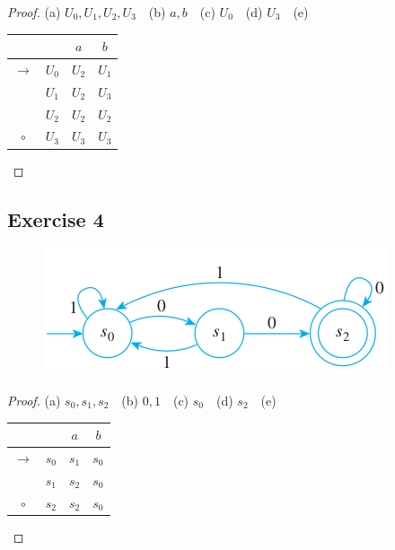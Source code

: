 \documentclass[14pt]{extarticle}
\begin{document}
\begin{proof}
    (a) \(U_0, U_1, U_2, U_3\) \,\, (b) \(a, b\) \,\, (c) \(U_0\) \,\, (d) \(U_3\) \,\, (e)
    \begin{tabular}{|c|c|c|c|}
        \hline
        \(\)      & \(\)    & \(a\)   & \(b\)   \\
        \hline
        \(\to\)   & \(U_0\) & \(U_2\) & \(U_1\) \\
        \hline
        \(\)      & \(U_1\) & \(U_2\) & \(U_3\) \\
        \hline
        \(\)      & \(U_2\) & \(U_2\) & \(U_2\) \\
        \hline
        \(\circ\) & \(U_3\) & \(U_3\) & \(U_3\) \\
        \hline
    \end{tabular}
\end{proof}

\subsection{Exercise 4}
\begin{figure}[ht!]
    \centering
    \includegraphics[scale=0.5]{../images/12.2.4.png}
\end{figure}

\begin{proof}
    (a) \(s_0, s_1, s_2\) \,\, (b) \(0, 1\) \,\, (c) \(s_0\) \,\, (d) \(s_2\) \,\, (e)
    \begin{tabular}{|c|c|c|c|}
        \hline
        \(\)      & \(\)    & \(a\)   & \(b\)   \\
        \hline
        \(\to\)   & \(s_0\) & \(s_1\) & \(s_0\) \\
        \hline
        \(\)      & \(s_1\) & \(s_2\) & \(s_0\) \\
        \hline
        \(\circ\) & \(s_2\) & \(s_2\) & \(s_0\) \\
        \hline
    \end{tabular}
\end{proof}
\end{document}
